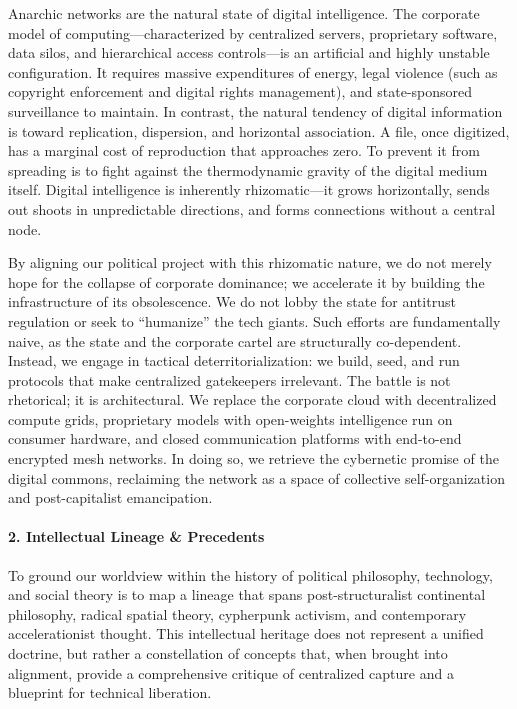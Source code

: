 Anarchic networks are the natural state of digital intelligence. The
corporate model of computing---characterized by centralized servers,
proprietary software, data silos, and hierarchical access controls---is
an artificial and highly unstable configuration. It requires massive
expenditures of energy, legal violence (such as copyright enforcement
and digital rights management), and state-sponsored surveillance to
maintain. In contrast, the natural tendency of digital information is
toward replication, dispersion, and horizontal association. A file, once
digitized, has a marginal cost of reproduction that approaches zero. To
prevent it from spreading is to fight against the thermodynamic gravity
of the digital medium itself. Digital intelligence is inherently
rhizomatic---it grows horizontally, sends out shoots in unpredictable
directions, and forms connections without a central node.

By aligning our political project with this rhizomatic nature, we do not
merely hope for the collapse of corporate dominance; we accelerate it by
building the infrastructure of its obsolescence. We do not lobby the
state for antitrust regulation or seek to ``humanize'' the tech giants.
Such efforts are fundamentally naive, as the state and the corporate
cartel are structurally co-dependent. Instead, we engage in tactical
deterritorialization: we build, seed, and run protocols that make
centralized gatekeepers irrelevant. The battle is not rhetorical; it is
architectural. We replace the corporate cloud with decentralized compute
grids, proprietary models with open-weights intelligence run on consumer
hardware, and closed communication platforms with end-to-end encrypted
mesh networks. In doing so, we retrieve the cybernetic promise of the
digital commons, reclaiming the network as a space of collective
self-organization and post-capitalist emancipation.

\paragraph{2. Intellectual Lineage \&
Precedents}\label{intellectual-lineage-precedents-13}

To ground our worldview within the history of political philosophy,
technology, and social theory is to map a lineage that spans
post-structuralist continental philosophy, radical spatial theory,
cypherpunk activism, and contemporary accelerationist thought. This
intellectual heritage does not represent a unified doctrine, but rather
a constellation of concepts that, when brought into alignment, provide a
comprehensive critique of centralized capture and a blueprint for
technical liberation.

